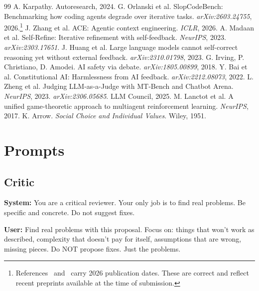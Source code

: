 \documentclass[10pt,twocolumn]{article}
\begin{document}
\begin{thebibliography}{99}
\small
{} A. Karpathy. Autoresearch, 2024.
 G. Orlanski et al. SlopCodeBench: Benchmarking how coding agents degrade over iterative tasks. \textit{arXiv:2603.24755}, 2026.\footnote{References~\cite{slopcodebench} and~\cite{ace} carry 2026 publication dates. These are correct and reflect recent preprints available at the time of submission.}
 J. Zhang et al. ACE: Agentic context engineering. \textit{ICLR}, 2026.
 A. Madaan et al. Self-Refine: Iterative refinement with self-feedback. \textit{NeurIPS}, 2023. \textit{arXiv:2303.17651}.
 J. Huang et al. Large language models cannot self-correct reasoning yet without external feedback. \textit{arXiv:2310.01798}, 2023.
 G. Irving, P. Christiano, D. Amodei. AI safety via debate. \textit{arXiv:1805.00899}, 2018.
 Y. Bai et al. Constitutional AI: Harmlessness from AI feedback. \textit{arXiv:2212.08073}, 2022.
 L. Zheng et al. Judging LLM-as-a-Judge with MT-Bench and Chatbot Arena. \textit{NeurIPS}, 2023. \textit{arXiv:2306.05685}.
 LLM Council, 2025.
 M. Lanctot et al. A unified game-theoretic approach to multiagent reinforcement learning. \textit{NeurIPS}, 2017.
 K. Arrow. \textit{Social Choice and Individual Values}. Wiley, 1951.
\end{thebibliography}

\onecolumn
\appendix

\section{Prompts}
\label{app:prompts}

\subsection{Critic}
\begin{tcolorbox}[promptbox]
\textbf{System:} You are a critical reviewer. Your only job is to find real problems. Be specific and concrete. Do not suggest fixes.

\textbf{User:} Find real problems with this proposal. Focus on: things that won't work as described, complexity that doesn't pay for itself, assumptions that are wrong, missing pieces. Do NOT propose fixes. Just the problems.
\end{tcolorbox}
\end{document}
